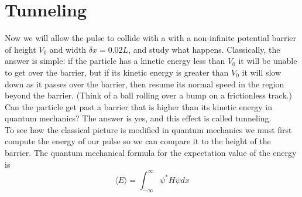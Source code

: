 \documentclass{book}
\theoremstyle{plain}
\theoremstyle{definition}
\numberwithin{exm}{chapter}
\theoremstyle{remark}
\theoremstyle{summary}
\theoremstyle{overview}
\begin{document}
\section*{Tunneling}
Now we will allow the pulse to collide with a with a non-infinite potential barrier
of height $V_0$ and width $\delta x = 0.02L$, and study what happens. Classically, the
answer is simple: if the particle has a kinetic energy less than $V_0$ it will be unable
to get over the barrier, but if its kinetic energy is greater than $V_0$ it will slow down
as it passes over the barrier, then resume its normal speed in the region beyond
the barrier. (Think of a ball rolling over a bump on a frictionless track.) Can
the particle get past a barrier that is higher than its kinetic energy in quantum
mechanics? The answer is yes, and this effect is called tunneling. \\ 
To see how the classical picture is modified in quantum mechanics we must
first compute the energy of our pulse so we can compare it to the height of the
barrier. The quantum mechanical formula for the expectation value of the energy
is
\begin{equation}\label{eq:86}
\langle E\rangle=\int_{-\infty}^{\infty} \psi^{*} H \psi d x
\end{equation}
\end{document}

